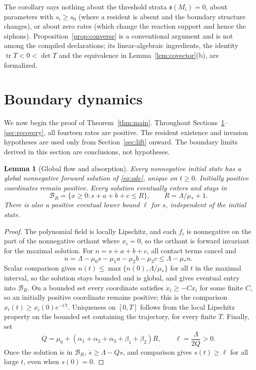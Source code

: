 \documentclass[11pt,a4paper]{article}
\theoremstyle{plain}
\newtheorem{lemma}[theorem]{Lemma}
\theoremstyle{definition}
\theoremstyle{remark}
\newcommand{\spb}{\mathfrak s}
\newcommand{\cB}{\mathcal B}
\DeclareMathOperator{\tr}{tr}
\begin{document}
The corollary says nothing about the threshold strata $\spb(M_i)=0$, about parameters with $s_i\ge s_0$ (where a resident is absent and the boundary structure changes), or about zero rates (which change the reaction support and hence the siphons). Proposition~\ref{prop:converse} is a conventional argument and is not among the compiled declarations; its linear-algebraic ingredients, the identity $\tr T<0<\det T$ and the equivalence in Lemma~\ref{lem:covector}(b), are formalized.

\section{Boundary dynamics}\label{sec:boundary}

We now begin the proof of Theorem~\ref{thm:main}. Throughout Sections~\ref{sec:boundary}--\ref{sec:recovery}, all fourteen rates are positive. The resident existence and invasion hypotheses are used only from Section~\ref{sec:lift} onward. The boundary limits derived in this section are conclusions, not hypotheses.

\begin{lemma}[Global flow and absorption]\label{lem:absorber}
Every nonnegative initial state has a global nonnegative forward solution of \eqref{eq:ode}, unique on $t\ge0$. Initially positive coordinates remain positive. Every solution eventually enters and stays in
\[
 \cB_R=\{x\ge0:s+a+b+c\le R\},\qquad R=\Lambda/\mu_*+1.
\]
There is also a positive eventual lower bound $\ell$ for $s$, independent of the initial state.
\end{lemma}
\begin{proof}
The polynomial field is locally Lipschitz, and each $f_i$ is nonnegative on the part of the nonnegative orthant where $x_i=0$, so the orthant is forward invariant for the maximal solution. For $n=s+a+b+c$, all contact terms cancel and
\begin{equation}\label{eq:balance}
 \dot n=\Lambda-\mu_0s-\mu_1a-\mu_2b-\mu_3c\le\Lambda-\mu_*n.
\end{equation}
Scalar comparison gives $n(t)\le\max\{n(0),\Lambda/\mu_*\}$ for all $t$ in the maximal interval, so the solution stays bounded and is global, and gives eventual entry into $\cB_R$. On a bounded set every coordinate satisfies $\dot x_i\ge-Cx_i$ for some finite $C$, so an initially positive coordinate remains positive; this is the comparison $x_i(t)\ge x_i(0)e^{-Ct}$. Uniqueness on $[0,T]$ follows from the local Lipschitz property on the bounded set containing the trajectory, for every finite $T$. Finally, set
\begin{equation}\label{eq:s-floor}
 Q=\mu_0+(\alpha_1+\alpha_2+\alpha_3+\beta_1+\beta_2)R,\qquad \ell=\frac{\Lambda}{2Q}>0.
\end{equation}
Once the solution is in $\cB_R$, $\dot s\ge\Lambda-Qs$, and comparison gives $s(t)\ge\ell$ for all large $t$, even when $s(0)=0$.
\end{proof}
\end{document}
